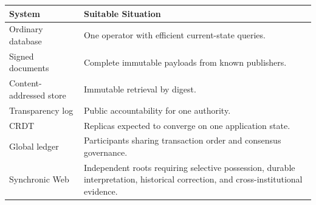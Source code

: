 \begin{tabularx}{\textwidth}{@{}>{\raggedright\arraybackslash}p{}>{\raggedright\arraybackslash}X@{}}
\toprule
\textbf{System} & \textbf{Suitable Situation} \\
\midrule
Ordinary database & One operator with efficient current-state queries. \\
Signed documents & Complete immutable payloads from known publishers. \\
Content-addressed store & Immutable retrieval by digest. \\
Transparency log & Public accountability for one authority. \\
CRDT & Replicas expected to converge on one application state. \\
Global ledger & Participants sharing transaction order and consensus governance. \\
Synchronic Web & Independent roots requiring selective possession, durable interpretation, historical correction, and cross-institutional evidence. \\
\bottomrule
\end{tabularx}
